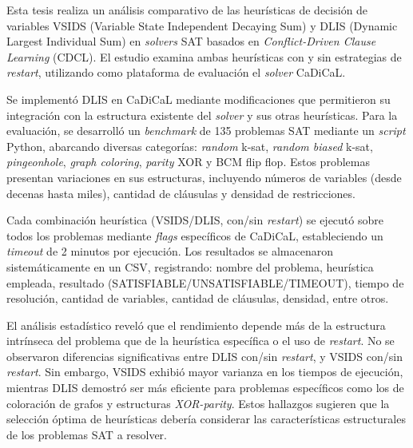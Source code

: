 \begin{resumen}
Esta tesis realiza un an\'alisis comparativo de las heur\'isticas de decisi\'on de variables VSIDS (Variable State Independent Decaying Sum) y DLIS (Dynamic Largest Individual Sum) en \textit{solvers} SAT basados en \textit{Conflict-Driven Clause Learning} (CDCL). El estudio examina ambas heur\'isticas con y sin estrategias de \textit{restart}, utilizando como plataforma de evaluaci\'on el \textit{solver} CaDiCaL. 

Se implement\'o DLIS en CaDiCaL mediante modificaciones que permitieron su integraci\'on con la estructura existente del \textit{solver} y sus otras heur\'isticas. Para la evaluaci\'on, se desarroll\'o un \textit{benchmark} de 135 problemas SAT mediante un \textit{script} Python, abarcando diversas categor\'ias: \textit{random }k-sat, \textit{random biased} k-sat, \textit{pingeonhole}, \textit{graph coloring}, \textit{parity} XOR y BCM flip flop. Estos problemas presentan variaciones en sus estructuras, incluyendo n\'umeros de variables (desde decenas hasta miles), cantidad de cl\'ausulas y densidad de restricciones.

Cada combinaci\'on heur\'istica (VSIDS/DLIS, con/sin \textit{restart}) se ejecut\'o sobre todos los problemas mediante \textit{flags} espec\'ificos de CaDiCaL, estableciendo un \textit{timeout} de 2 minutos por ejecuci\'on. Los resultados se almacenaron sistem\'aticamente en un CSV, registrando: nombre del problema, heur\'istica empleada, resultado (SATISFIABLE/UNSATISFIABLE/TIMEOUT), tiempo de resoluci\'on, cantidad de variables, cantidad de cl\'ausulas, densidad, entre otros.

El an\'alisis estad\'istico revel\'o que el rendimiento depende m\'as de la estructura intr\'inseca del problema que de la heur\'istica espec\'ifica o el uso de \textit{restart}. No se observaron diferencias significativas entre DLIS con/sin \textit{restart}, y VSIDS con/sin \textit{restart}. Sin embargo, VSIDS exhibi\'o mayor varianza en los tiempos de ejecuci\'on, mientras DLIS demostr\'o ser m\'as eficiente para problemas espec\'ificos como los de coloraci\'on de grafos y estructuras \textit{XOR-parity}. Estos hallazgos sugieren que la selecci\'on \'optima de heur\'isticas deber\'ia considerar las caracter\'isticas estructurales de los problemas SAT a resolver.
\end{resumen}

